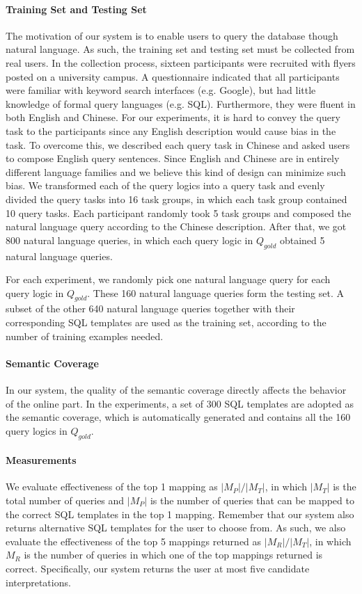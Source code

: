 \documentclass{vldb}
\begin{document}
\paragraph*{Training Set and Testing Set}
The motivation of our system is to enable users to query the database though natural language. As such, the training set and testing set must be collected from real users. In the collection process, sixteen participants were recruited with flyers posted on a university campus. A questionnaire indicated that all participants were familiar with keyword search interfaces (e.g. Google), but had little knowledge of formal query languages (e.g. SQL). Furthermore, they were fluent in both English and Chinese. For our experiments, it is hard to convey the query task to the participants since any English description would cause bias in the task. To overcome this, we described each query task in Chinese and asked users to compose English query sentences. Since English and Chinese are in entirely different language families and we believe this kind of design can minimize such bias. We transformed each of the query logics into a query task and evenly divided the query tasks into 16 task groups, in which each task group contained 10 query tasks. Each participant randomly took 5 task groups and composed the natural language query according to the Chinese description. After that, we got 800 natural language queries, in which each query logic in $Q_{gold}$ obtained 5 natural language queries.  

For each experiment, we randomly pick one natural language query for each query logic in $Q_{gold}$.  These 160 natural language queries form the testing set.  A subset of the other 640 natural language queries together with their corresponding SQL templates are used as the training set, according to the number of training examples needed.  

\paragraph*{Semantic Coverage}
In our system, the quality of the semantic coverage directly affects the behavior of the online part.  In the experiments, a set of 300 SQL templates are adopted as the semantic coverage, which is automatically generated and contains all the 160 query logics in $Q_{gold}$.  

\paragraph*{Measurements}
We evaluate effectiveness of the top 1 mapping as $|M_P|/|M_T|$, in which $|M_T|$ is the total number of queries and $|M_P|$ is the number of queries that can be mapped to the correct SQL templates in the top 1 mapping.  Remember that our system also returns alternative SQL templates for the user to choose from.  As such, we also evaluate the effectiveness of the top 5 mappings returned as $|M_R|/|M_T|$, in which $M_R$ is the number of queries in which one of the top mappings returned is correct.  Specifically, our system returns the user at most five candidate interpretations.  
\end{document}
